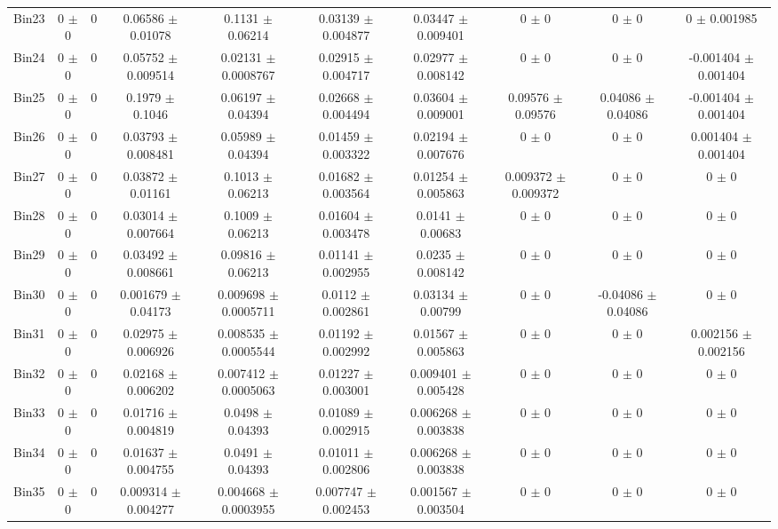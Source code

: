 \begin{tabular}{@{\extracolsep{4pt}}lccccccccc@{}}
     Bin23 & 0 $\pm$ 0 & 0 & 0.06586 $\pm$ 0.01078 & 0.1131 $\pm$ 0.06214 & 0.03139 $\pm$ 0.004877 & 0.03447 $\pm$ 0.009401 & 0 $\pm$ 0 & 0 $\pm$ 0 & 0 $\pm$ 0.001985 \\ 
     Bin24 & 0 $\pm$ 0 & 0 & 0.05752 $\pm$ 0.009514 & 0.02131 $\pm$ 0.0008767 & 0.02915 $\pm$ 0.004717 & 0.02977 $\pm$ 0.008142 & 0 $\pm$ 0 & 0 $\pm$ 0 & -0.001404 $\pm$ 0.001404 \\ 
     Bin25 & 0 $\pm$ 0 & 0 & 0.1979 $\pm$ 0.1046 & 0.06197 $\pm$ 0.04394 & 0.02668 $\pm$ 0.004494 & 0.03604 $\pm$ 0.009001 & 0.09576 $\pm$ 0.09576 & 0.04086 $\pm$ 0.04086 & -0.001404 $\pm$ 0.001404 \\ 
     Bin26 & 0 $\pm$ 0 & 0 & 0.03793 $\pm$ 0.008481 & 0.05989 $\pm$ 0.04394 & 0.01459 $\pm$ 0.003322 & 0.02194 $\pm$ 0.007676 & 0 $\pm$ 0 & 0 $\pm$ 0 & 0.001404 $\pm$ 0.001404 \\ 
     Bin27 & 0 $\pm$ 0 & 0 & 0.03872 $\pm$ 0.01161 & 0.1013 $\pm$ 0.06213 & 0.01682 $\pm$ 0.003564 & 0.01254 $\pm$ 0.005863 & 0.009372 $\pm$ 0.009372 & 0 $\pm$ 0 & 0 $\pm$ 0 \\ 
     Bin28 & 0 $\pm$ 0 & 0 & 0.03014 $\pm$ 0.007664 & 0.1009 $\pm$ 0.06213 & 0.01604 $\pm$ 0.003478 & 0.0141 $\pm$ 0.00683 & 0 $\pm$ 0 & 0 $\pm$ 0 & 0 $\pm$ 0 \\ 
     Bin29 & 0 $\pm$ 0 & 0 & 0.03492 $\pm$ 0.008661 & 0.09816 $\pm$ 0.06213 & 0.01141 $\pm$ 0.002955 & 0.0235 $\pm$ 0.008142 & 0 $\pm$ 0 & 0 $\pm$ 0 & 0 $\pm$ 0 \\ 
     Bin30 & 0 $\pm$ 0 & 0 & 0.001679 $\pm$ 0.04173 & 0.009698 $\pm$ 0.0005711 & 0.0112 $\pm$ 0.002861 & 0.03134 $\pm$ 0.00799 & 0 $\pm$ 0 & -0.04086 $\pm$ 0.04086 & 0 $\pm$ 0 \\ 
     Bin31 & 0 $\pm$ 0 & 0 & 0.02975 $\pm$ 0.006926 & 0.008535 $\pm$ 0.0005544 & 0.01192 $\pm$ 0.002992 & 0.01567 $\pm$ 0.005863 & 0 $\pm$ 0 & 0 $\pm$ 0 & 0.002156 $\pm$ 0.002156 \\ 
     Bin32 & 0 $\pm$ 0 & 0 & 0.02168 $\pm$ 0.006202 & 0.007412 $\pm$ 0.0005063 & 0.01227 $\pm$ 0.003001 & 0.009401 $\pm$ 0.005428 & 0 $\pm$ 0 & 0 $\pm$ 0 & 0 $\pm$ 0 \\ 
     Bin33 & 0 $\pm$ 0 & 0 & 0.01716 $\pm$ 0.004819 & 0.0498 $\pm$ 0.04393 & 0.01089 $\pm$ 0.002915 & 0.006268 $\pm$ 0.003838 & 0 $\pm$ 0 & 0 $\pm$ 0 & 0 $\pm$ 0 \\ 
     Bin34 & 0 $\pm$ 0 & 0 & 0.01637 $\pm$ 0.004755 & 0.0491 $\pm$ 0.04393 & 0.01011 $\pm$ 0.002806 & 0.006268 $\pm$ 0.003838 & 0 $\pm$ 0 & 0 $\pm$ 0 & 0 $\pm$ 0 \\ 
     Bin35 & 0 $\pm$ 0 & 0 & 0.009314 $\pm$ 0.004277 & 0.004668 $\pm$ 0.0003955 & 0.007747 $\pm$ 0.002453 & 0.001567 $\pm$ 0.003504 & 0 $\pm$ 0 & 0 $\pm$ 0 & 0 $\pm$ 0 \\ 

\end{tabular}
